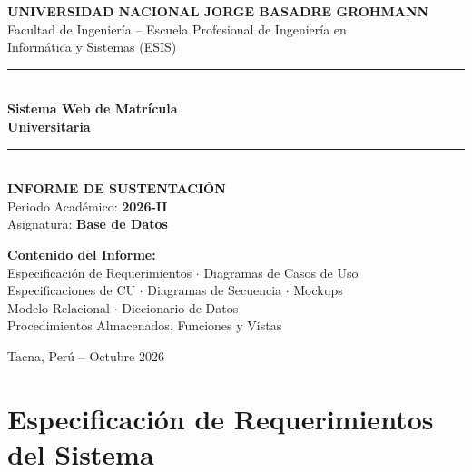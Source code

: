 \documentclass[12pt,a4paper]{article}
\begin{document}

\begin{titlepage}
  \centering
  \vspace*{1.5cm}

  {\Large\bfseries\color{unjbgblue}
    UNIVERSIDAD NACIONAL JORGE BASADRE GROHMANN\\[4pt]
  }
  {\normalsize\color{darkgray}
    Facultad de Ingenier\'ia -- Escuela Profesional de Ingenier\'ia en\\
    Inform\'atica y Sistemas (ESIS)\\[1.5cm]
  }

  \noindent\rule{\linewidth}{2pt}\\[6pt]
  {\Huge\bfseries\color{unjbgblue}
    Sistema Web de Matr\'icula\\[6pt]
    Universitaria
  }\\[6pt]
  \noindent\rule{\linewidth}{2pt}\\[1.5cm]

  {\large\bfseries INFORME DE SUSTENTACI\'ON}\\[0.4cm]
  {\normalsize\color{darkgray}
    Periodo Acad\'emico: \textbf{2026-II}\\
    Asignatura: \textbf{Base de Datos}\\[1.5cm]
  }

  \begin{tcolorbox}[colback=unjbgblue!8,colframe=unjbgblue,width=0.85\linewidth]
    \centering\small
    \textbf{Contenido del Informe:}\\[4pt]
    Especificaci\'on de Requerimientos $\cdot$ Diagramas de Casos de Uso\\
    Especificaciones de CU $\cdot$ Diagramas de Secuencia $\cdot$ Mockups\\
    Modelo Relacional $\cdot$ Diccionario de Datos\\
    Procedimientos Almacenados, Funciones y Vistas
  \end{tcolorbox}

  \vfill
  {\normalsize\color{darkgray}Tacna, Per\'u -- Octubre 2026}
\end{titlepage}

\tableofcontents
\newpage

\section{Especificaci\'on de Requerimientos del Sistema}
\end{document}
